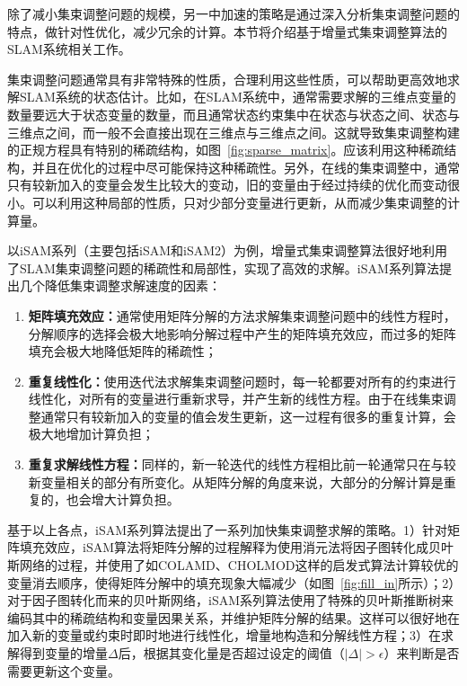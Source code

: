 除了减小集束调整问题的规模，另一中加速的策略是通过深入分析集束调整问题的特点，做针对性优化，减少冗余的计算。本节将介绍基于增量式集束调整算法的SLAM系统相关工作。

集束调整问题通常具有非常特殊的性质，合理利用这些性质，可以帮助更高效地求解SLAM系统的状态估计。比如，在SLAM系统中，通常需要求解的三维点变量的数量要远大于状态变量的数量，而且通常状态约束集中在状态与状态之间、状态与三维点之间，而一般不会直接出现在三维点与三维点之间。这就导致集束调整构建的正规方程具有特别的稀疏结构，如图~\ref{fig:sparse_matrix}。应该利用这种稀疏结构，并且在优化的过程中尽可能保持这种稀疏性。另外，在线的集束调整中，通常只有较新加入的变量会发生比较大的变动，旧的变量由于经过持续的优化而变动很小。可以利用这种局部的性质，只对少部分变量进行更新，从而减少集束调整的计算量。

以iSAM系列（主要包括iSAM\citep{kaess2008isam}和iSAM2\citep{kaess2012isam2}）为例，增量式集束调整算法很好地利用了SLAM集束调整问题的稀疏性和局部性，实现了高效的求解。iSAM系列算法提出几个降低集束调整求解速度的因素：
\begin{enumerate}
    \item \textbf{矩阵填充效应：}通常使用矩阵分解的方法求解集束调整问题中的线性方程时，分解顺序的选择会极大地影响分解过程中产生的矩阵填充效应，而过多的矩阵填充会极大地降低矩阵的稀疏性；
    \item \textbf{重复线性化：}使用迭代法求解集束调整问题时，每一轮都要对所有的约束进行线性化，对所有的变量进行重新求导，并产生新的线性方程。由于在线集束调整通常只有较新加入的变量的值会发生更新，这一过程有很多的重复计算，会极大地增加计算负担；
    \item \textbf{重复求解线性方程：}同样的，新一轮迭代的线性方程相比前一轮通常只在与较新变量相关的部分有所变化。从矩阵分解的角度来说，大部分的分解计算是重复的，也会增大计算负担。
\end{enumerate}

基于以上各点，iSAM系列算法提出了一系列加快集束调整求解的策略。1）针对矩阵填充效应，iSAM算法将矩阵分解的过程解释为使用消元法将因子图转化成贝叶斯网络的过程，并使用了如COLAMD\citep{davis2004algorithm}、CHOLMOD\citep{chen2008algorithm}这样的启发式算法计算较优的变量消去顺序，使得矩阵分解中的填充现象大幅减少（如图~\ref{fig:fill_in}所示）；2）对于因子图转化而来的贝叶斯网络，iSAM系列算法使用了特殊的贝叶斯推断树来编码其中的稀疏结构和变量因果关系，并维护矩阵分解的结果。这样可以很好地在加入新的变量或约束时即时地进行线性化，增量地构造和分解线性方程；3）在求解得到变量的增量$\Delta$后，根据其变化量是否超过设定的阈值（$|\Delta|>\epsilon$）来判断是否需要更新这个变量。

